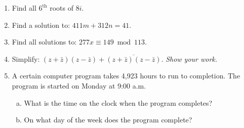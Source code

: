 
\begin{enumerate}[(1)]
\item
Find all $6^{\text{th}}$ roots of  $8i$.
\item
 Find a solution to:  $411m + 312n = 41 $.
\item
Find all solutions to: $277x \equiv 149 \bmod{113}$.
\item
Simplify:  $(z + \bar{z})(z - \bar{z}) + \overline{(z + \bar{z})(z - \bar{z})}$. \emph{Show your work.}
\item
A certain computer program takes 4,923 hours to run to completion. The program is started on Monday at 9:00 a.m.
\begin{enumerate}[(a)]
\item
What is the time on the clock when the program completes?
\item
On what day of the week does the program complete?
\end{enumerate}
\end{enumerate}
